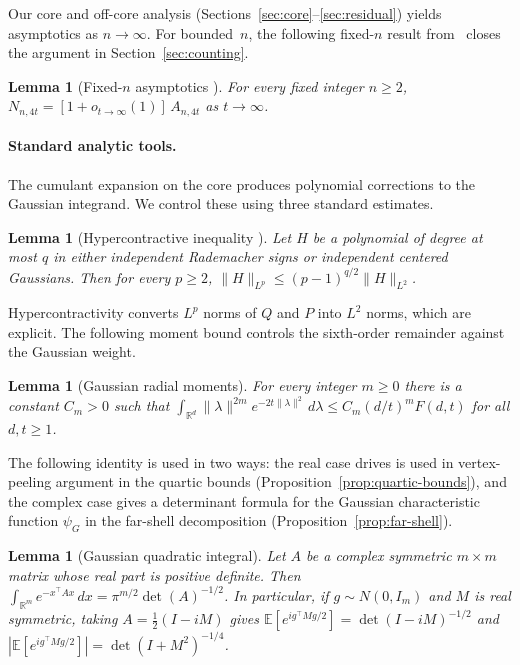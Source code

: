 \documentclass[11pt]{article}
\newtheorem{lemma}[theorem]{Lemma}
\theoremstyle{definition}
\newcommand{\R}{\mathbb{R}}
\newcommand{\E}{\mathbb{E}}
\begin{document}
Our core and off-core analysis (Sections~\ref{sec:core}--\ref{sec:residual}) yields asymptotics as \(n\to\infty\). For bounded~\(n\), the following fixed-\(n\) result from~\cite{DL10} closes the argument in Section~\ref{sec:counting}.

\begin{lemma}[Fixed-\(n\) asymptotics {\cite[Theorem~4.1]{DL10}}]\label{fact:fixed-n-dl10}
For every fixed integer \(n\ge 2\),
\(N_{n,4t}=[1+o_{t\to\infty}(1)]\,A_{n,4t}\) as \(t\to\infty\).
\end{lemma}

\paragraph{Standard analytic tools.}
The cumulant expansion on the core produces polynomial corrections to the Gaussian integrand. We control these using three standard estimates.

\begin{lemma}[Hypercontractive inequality {\cite[Theorems~9.22 and~11.23]{ODo2014}}]\label{lem:hc}
Let \(H\) be a polynomial of degree at most \(q\) in either independent Rademacher signs or independent centered Gaussians. Then for every \(p\ge 2\),
\(\|H\|_{L^p}\le (p-1)^{q/2}\|H\|_{L^2}\).
\end{lemma}

Hypercontractivity converts \(L^p\) norms of \(Q\) and \(P\) into \(L^2\) norms, which are explicit. The following moment bound controls the sixth-order remainder against the Gaussian weight.

\begin{lemma}[Gaussian radial moments]\label{lem:gaussian-radial}
For every integer \(m\ge 0\) there is a constant \(C_m>0\) such that
\(\int_{\R^d}\|\lambda\|^{2m}e^{-2t\|\lambda\|^2}\,d\lambda
\le C_m(d/t)^m F(d,t)\) for all \(d,t\ge 1\).
\end{lemma}

The following identity is used in two ways: the real case drives is used in vertex-peeling argument in the quartic bounds (Proposition~\ref{prop:quartic-bounds}), and the complex case gives a determinant formula for the Gaussian characteristic function \(\psi_G\) in the far-shell decomposition (Proposition~\ref{prop:far-shell}).

\begin{lemma}[Gaussian quadratic integral]\label{lem:gaussian-quadratic}
Let \(A\) be a complex symmetric \(m\times m\) matrix whose real part is positive definite. Then
\(\int_{\R^m}e^{-x^\top A x}\,dx=\pi^{m/2}\det(A)^{-1/2}\).
In particular, if \(g\sim N(0,I_m)\) and \(M\) is real symmetric, taking \(A=\tfrac12(I-iM)\) gives \(\E[e^{ig^\top Mg/2}]=\det(I-iM)^{-1/2}\) and \(|\E[e^{ig^\top Mg/2}]|=\det(I+M^2)^{-1/4}\).
\end{lemma}
\end{document}
